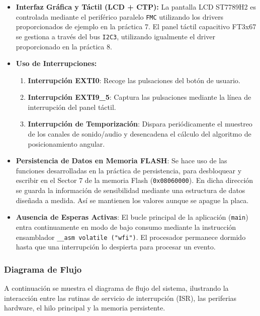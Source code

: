 \documentclass[../main.tex]{subfiles}
\begin{document}
            \begin{itemize}
                \item \textbf{Interfaz Gráfica y Táctil (LCD + CTP):} La pantalla LCD ST7789H2 es controlada mediante el periférico paralelo \texttt{FMC} utilizando los drivers proporcionados de ejemplo en la práctica 7. El panel táctil capacitivo FT3x67 se gestiona a través del bus \texttt{I2C3}, utilizando igualmente el driver proporcionado en la práctica 8.
                \item \textbf{Uso de Interrupciones:}
                \begin{enumerate}
                    \item \textbf{Interrupción EXTI0}: Recoge las pulsaciones del botón de usuario.
                    \item \textbf{Interrupción EXTI9\_5}: Captura las pulsaciones mediante la línea de interrupción del panel táctil.
                    \item \textbf{Interrupción de Temporización}: Dispara periódicamente el muestreo de los canales de sonido/audio y desencadena el cálculo del algoritmo de posicionamiento angular.
                \end{enumerate}
                \item \textbf{Persistencia de Datos en Memoria FLASH}: Se hace uso de las funciones desarrolladas en la práctica de persistencia, para desbloquear y escribir en el Sector 7 de la memoria Flash (\texttt{0x08060000}). En dicha dirección se guarda la información de sensibilidad mediante una estructura de datos diseñada a medida. Así se mantienen los valores aunque se apague la placa.
                \item \textbf{Ausencia de Esperas Activas}: El bucle principal de la aplicación (\texttt{main}) entra continuamente en modo de bajo consumo mediante la instrucción ensamblador \texttt{\_\_asm volatile ("wfi")}. El procesador permanece dormido hasta que una interrupción lo despierta para procesar un evento.
            \end{itemize}



        \subsubsection{Diagrama de Flujo}
            A continuación se muestra el diagrama de flujo del sistema, ilustrando la interacción entre las rutinas de servicio de interrupción (ISR), las periferias hardware, el hilo principal y la memoria persistente.
\end{document}
